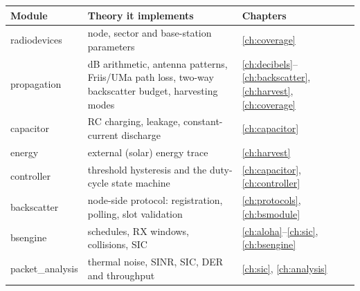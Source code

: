 \begin{center}
\small
\renewcommand{\arraystretch}{1.12}
\begin{tabularx}{\linewidth}{@{}>{\ttfamily}p{2.9cm}Xl@{}}
\toprule
\normalfont\sffamily\bfseries Module & Theory it implements & Chapters\\
\midrule
radiodevices & node, sector and base-station parameters & \ref{ch:coverage}\\
propagation & dB arithmetic, antenna patterns, Friis/UMa path loss, two-way backscatter budget, harvesting modes & \ref{ch:decibels}--\ref{ch:backscatter}, \ref{ch:harvest}, \ref{ch:coverage}\\
capacitor & RC charging, leakage, constant-current discharge & \ref{ch:capacitor}\\
energy & external (solar) energy trace & \ref{ch:harvest}\\
controller & threshold hysteresis and the duty-cycle state machine & \ref{ch:capacitor}, \ref{ch:controller}\\
backscatter & node-side protocol: registration, polling, slot validation & \ref{ch:protocols}, \ref{ch:bsmodule}\\
bsengine & schedules, RX windows, collisions, SIC & \ref{ch:aloha}--\ref{ch:sic}, \ref{ch:bsengine}\\
packet\_analysis & thermal noise, SINR, SIC, DER and throughput & \ref{ch:sic}, \ref{ch:analysis}\\
\bottomrule
\end{tabularx}
\end{center}


